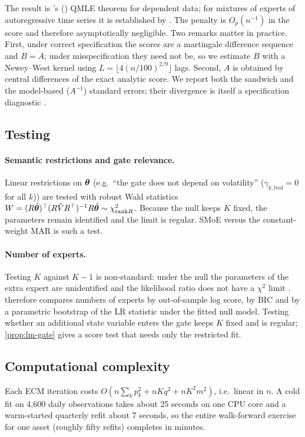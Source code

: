 \noindent The result is \citeauthor{white1982maximum}'s (\citeyear{white1982maximum}) QMLE theorem
for dependent data; for mixtures of experts of autoregressive time series it is established by
\citet{carvalho2005mixtures}. The penalty is $O_p(n^{-1})$ in the score and therefore asymptotically
negligible. Two remarks matter in practice. First, under correct specification the scores are a
martingale difference sequence and $B=A$; under misspecification they need not be, so we estimate
$B$ with a Newey--West kernel \citep{newey1987simple} using
$L=\lfloor4(n/100)^{2/9}\rfloor$ lags. Second, $A$ is obtained by central differences of the exact
analytic score. We report both the sandwich and the model-based ($A^{-1}$) standard errors; their
divergence is itself a specification diagnostic \citep{white1982maximum}.

\subsection{Testing}

\paragraph{Semantic restrictions and gate relevance.} Linear restrictions on $\bm{\theta}$ (e.g.\
``the gate does not depend on volatility'' ($\gamma_{k,\mathrm{lvol}}=0$ for all $k$)) are tested
with robust Wald statistics $W=(R\hat{\bm{\theta}})^\top(R\hat V R^\top)^{-1}R\hat{\bm{\theta}}\sim\chi^2_{\mathrm{rank}R}$.
Because the null keeps $K$ fixed, the parameters remain identified and the limit is regular.
SMoE versus the constant-weight MAR is such a test.

\paragraph{Number of experts.} Testing $K$ against $K-1$ is non-standard: under the null the
parameters of the extra expert are unidentified and the likelihood ratio does not have a $\chi^2$
limit \citep{hansen1996inference,chen2001modified}. \Cref{sec:kgate} therefore compares numbers of
experts by out-of-sample log score, by BIC and by a parametric bootstrap of the LR statistic under
the fitted null model. Testing whether an additional state variable enters the gate keeps $K$ fixed
and is regular; \cref{prop:lm-gate} gives a score test that needs only the restricted fit.

\subsection{Computational complexity}

Each ECM iteration costs $O(n\sum_kp_k^2+nKq^2+nK^2m^2)$, i.e.\ linear in $n$. A cold fit on 4,600
daily observations takes about 25 seconds on one CPU core and a warm-started quarterly refit about
7 seconds, so the entire walk-forward exercise for one asset (roughly fifty refits) completes in
minutes.
